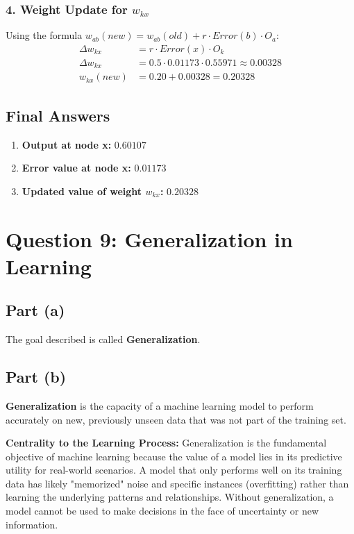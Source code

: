 \documentclass{article}
\begin{document}
\subsubsection*{4. Weight Update for $w_{kx}$}
Using the formula $w_{ab}(new) = w_{ab}(old) + r \cdot Error(b) \cdot O_a$:
\begin{align*}
    \Delta w_{kx} &= r \cdot Error(x) \cdot O_k \\
    \Delta w_{kx} &= 0.5 \cdot 0.01173 \cdot 0.55971 \approx 0.00328 \\
    w_{kx}(new) &= 0.20 + 0.00328 = 0.20328
\end{align*}

\subsection*{Final Answers}
\begin{enumerate}
    \item \textbf{Output at node x:} $0.60107$
    \item \textbf{Error value at node x:} $0.01173$
    \item \textbf{Updated value of weight $w_{kx}$:} $0.20328$
\end{enumerate}

\pagebreak

\section*{Question 9: Generalization in Learning}

\subsection*{Part (a)}
The goal described is called \textbf{Generalization}.

\subsection*{Part (b)}
\textbf{Generalization} is the capacity of a machine learning model to perform accurately on new, previously unseen data that was not part of the training set.

\textbf{Centrality to the Learning Process:}
Generalization is the fundamental objective of machine learning because the value of a model lies in its predictive utility for real-world scenarios. A model that only performs well on its training data has likely "memorized" noise and specific instances (overfitting) rather than learning the underlying patterns and relationships. Without generalization, a model cannot be used to make decisions in the face of uncertainty or new information.
\end{document}

